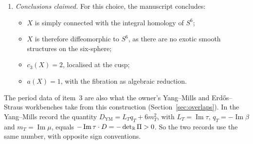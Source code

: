 \begin{enumerate}[label=\arabic*.]
\item \emph{Conclusions claimed.} For this choice, the manuscript concludes:
\begin{itemize}
\item $X$ is simply connected with the integral homology of $S^6$;
\item $X$ is therefore diffeomorphic to $S^6$, as there are no exotic smooth structures on the six-sphere;
\item $c_3(X)=2$, localised at the cusp;
\item $a(X)=1$, with the fibration as algebraic reduction.
\end{itemize}
\end{enumerate}

The period data of item~3 are also what the owner's Yang--Mills and Erdős--Straus workbenches take from this construction (Section~\ref{sec:overlaps}). In the Yang--Mills record the quantity $D_{\mathrm{YM}}=L_Tq_T+6m_T^2$, with $L_T=\operatorname{Im}\tau$, $q_T=-\operatorname{Im}\beta$ and $m_T=\operatorname{Im}\mu$, equals $-\operatorname{Im}\tau\cdot D=-\det_{\mathbb{R}}\Pi>0$. So the two records use the same number, with opposite sign conventions.
